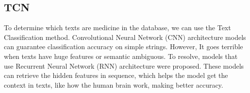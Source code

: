 




\subsection{TCN}

To determine which texts are medicine in the database, we can use the Text Classification method. Convolutional Neural Network (CNN) architecture models can guarantee classification accuracy on simple strings. However, It goes terrible when texts have huge features or semantic ambiguous. To resolve, models that use Recurrent Neural Network (RNN) architecture were proposed. These models can retrieve the hidden features in sequence, which helps the model get the context in texts, like how the human brain work, making better accuracy.

